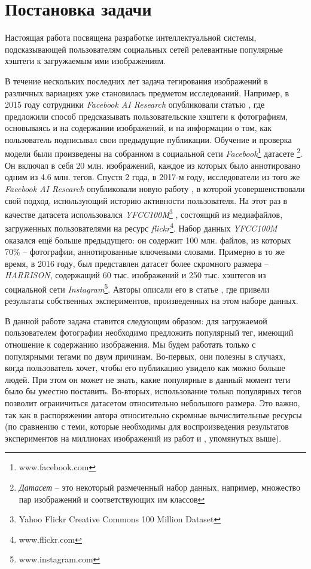 \section{Постановка задачи}


\indent
\indent
Настоящая работа посвящена разработке интеллектуальной системы, 
подсказывающей пользователям социальных сетей 
релевантные популярные хэштеги к загружаемым ими изображениям.


\indent
\indent
В течение нескольких последних лет
задача тегирования изображений в различных вариациях уже становилась
предметом исследований. Например, в 2015 году сотрудники
\textit{Facebook AI Research} опубликовали статью
\cite{hashtags_facebook2015}, где предложили способ
предсказывать пользовательские
хэштеги к фотографиям, основываясь и на содержании 
изображений, и на информации о том, как пользователь подписывал
свои предыдущие публикации. Обучение и проверка модели были 
произведены на собранном в социальной сети
\textit{Facebook}\footnote{www.facebook.com}
датасете \footnote{\textit{Датасет} -- это некоторый размеченный набор данных,
например, множество пар изображений и соответствующих им классов}.
Он включал в себя 20 млн. изображений, каждое из которых было
аннотировано одним из 4.6 млн. тегов. Спустя 2 года,
в 2017-м году, исследователи
из того же \textit{Facebook AI Research} опубликовали 
новую работу \cite{hashtags_facebook2017},
в которой усовершенствовали свой подход,
использующий историю активности пользователя. На этот раз
в качестве датасета использовался 
\textit{YFCC100M}\footnote{Yahoo Flickr Creative Commons 100 Million Dataset}
\cite{yfcc100m},
состоящий из медиафайлов, загруженных пользователями на ресурс
\textit{flickr}\footnote{www.flickr.com}. 
Набор данных \textit{YFCC100M} оказался ещё больше предыдущего:
он содержит 100 млн. файлов, из которых 70\% -- фотографии, аннотированные
ключевыми словами. Примерно в то же время, в 2016 году, был представлен 
датасет более скромного размера -- \textit{HARRISON},
содержащий 60 тыс. изображений  и 250 тыс. хэштегов из социальной сети 
\textit{Instagram}\footnote{www.instagram.com}. Авторы описали его
в статье \cite{harrison}, где привели результаты
собственных экспериментов, произведенных на этом 
наборе данных.


\indent
\indent
В данной работе задача ставится следующим образом: для загружаемой 
пользователем фотографии необходимо предложить популярный тег,
имеющий отношение к содержанию изображения. Мы будем работать
только с популярными тегами по двум причинам.
Во-первых, они полезны в 
случаях, когда пользователь хочет, чтобы его публикацию увидело как можно
больше людей. При этом он может не знать, какие популярные в данный момент
теги было бы уместно поставить. 
Во-вторых, использование только популярных тегов 
позволит ограничиться датасетом относительно небольшого размера. 
Это важно, так как в распоряжении автора относительно скромные вычислительные
ресурсы (по сравнению с теми, которые необходимы для воспроизведения
результатов экспериментов на миллионах изображений из работ
\cite{hashtags_facebook2015} и \cite{hashtags_facebook2017}, упомянутых выше).


